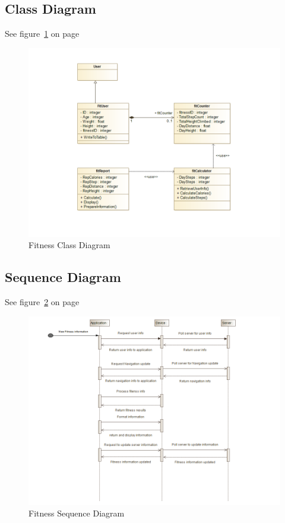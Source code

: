 \subsection{Class Diagram}
See figure~\ref{fig:Fitness_Class_Diagram} on page~\pageref{fig:Fitness_Class_Diagram}
\begin{figure}
	\centering
	\includegraphics[scale=0.54]{Fitness/Fitness_Class_Diagram.png}
	\caption{Fitness Class Diagram}
	\label{fig:Fitness_Class_Diagram}
\end{figure}

\subsection{Sequence Diagram}
See figure~\ref{fig:Fitness_Sequence_Diagram} on page~\pageref{fig:Fitness_Sequence_Diagram}
\begin{figure}
	\centering
	\includegraphics[scale=0.54]{Fitness/Fitness_Sequence_Diagram.png}
	\caption{Fitness Sequence Diagram}
	\label{fig:Fitness_Sequence_Diagram}
\end{figure}

